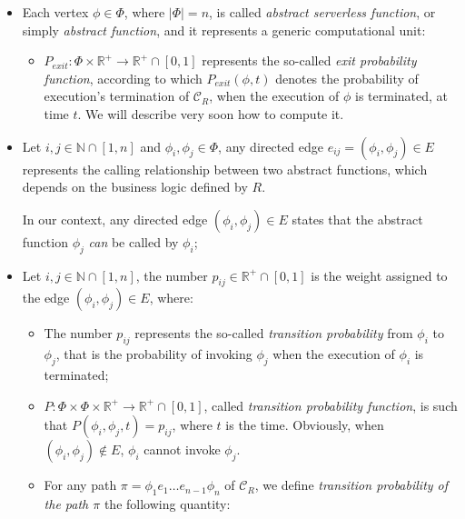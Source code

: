 \documentclass[12pt,a4paper]{report}
\newcommand{\N}{\mathbb{N}}
\newcommand{\Rplus}{\mathbb{R}^+}
\newcommand{\SetFromZeroToOne}{\left[0,1\right]}
\begin{document}
\begin{itemize}
				
	\item Each vertex $\phi \in \Phi$, where $|\Phi| = n$, is called \textit{abstract serverless function}, or simply \textit{abstract  function}, and it represents a generic computational unit:
	
	\begin{itemize}
				
		\item $P_{exit} : \Phi \times \Rplus \to \Rplus \cap \SetFromZeroToOne$ represents the so-called \textit{exit probability function}, according to which $P_{exit}(\phi,t)$ denotes the probability of execution's termination of $\mathcal{C}_R$, when the execution of $\phi$ is terminated, at time $t$. We will describe very soon how to compute it.
	\end{itemize}
	
	\item Let $i,j \in \N \cap \left[ 1, n \right]$ and $\phi_i, \phi_j \in \Phi$, any directed edge $e_{ij} = \left( \phi_i, \phi_j \right) \in E$ represents the calling relationship between two abstract functions, which depends on the business logic defined by $R$. 
	
	In our context, any directed edge $\left( \phi_i, \phi_j \right) \in E$ states that the abstract function $\phi_j$ \textit{can} be called by $\phi_i$;
	
	\item Let $i,j \in \N \cap \left[ 1, n \right]$, the number $p_{ij} \in \Rplus \cap \SetFromZeroToOne$ is the weight assigned to the edge $\left(\phi_i, \phi_j \right) \in E$, where: 
	
	\begin{itemize}
		
		\item The number $p_{ij}$ represents the so-called \textit{transition probability} from $\phi_i$ to $\phi_j$, that is the probability of invoking $\phi_j$ when the execution of $\phi_i$ is terminated;
		
		\item $P : \Phi \times \Phi \times \Rplus \to \Rplus \cap \left[ 0, 1 \right]$, called \textit{transition probability function}, is such that $P\left(\phi_i, \phi_j, t \right) = p_{ij}$, where $t$ is the time. Obviously, when $\left( \phi_i, \phi_j \right) \notin E$, $\phi_i$ cannot invoke $\phi_j$. 
		
		\item For any path $\pi = \phi_1 e_1 \ldots e_{n-1} \phi_n$ of $\mathcal{C}_R$, we define \textit{transition probability of the path $\pi$} the following quantity:
		

\end{itemize}
\end{itemize}
\end{document}
